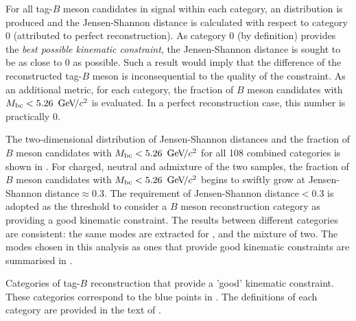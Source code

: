 For all tag-$B$ meson candidates in signal \MC within each category, an \Mbc distribution is produced 
and the Jensen-Shannon distance is calculated with respect to category 0 (attributed to perfect reconstruction).
As category 0 (by definition) provides the \textit{best possible kinematic constraint}, the Jensen-Shannon distance is sought to be as close to 0 as possible.
Such a result would imply that the difference of the reconstructed tag-$B$ meson is inconsequential to the quality of the constraint.
As an additional metric, for each category, the fraction of $B$ meson candidates with ${M_{\mathrm{bc}}}<5.26~{\mathrm{\,Ge\kern -0.1em V\!/}c^2}$ is evaluated.
In a perfect reconstruction case, this number is practically 0.

The two-dimensional distribution of Jensen-Shannon distances and the fraction of $B$ meson candidates with ${M_{\mathrm{bc}}}<5.26~{\mathrm{\,Ge\kern -0.1em V\!/}c^2}$
for all 108 combined categories is shown in .
For charged, neutral and admixture of the two samples, the fraction of $B$ meson candidates with ${M_{\mathrm{bc}}}<5.26~{\mathrm{\,Ge\kern -0.1em V\!/}c^2}$ begins to swiftly grow at Jensen-Shannon distance$\approx0.3$.
The requirement of Jensen-Shannon distance$<0.3$ is adopted as the threshold to consider a $B$ meson reconstruction category as providing a good kinematic constraint.
The results between different categories are consistent: the same modes are extracted for \Bp, \Bz and the mixture of two.
The modes chosen in this analysis as ones that provide good kinematic constraints are summarised in .

\begin{table}[htbp!]
    \centering
    \caption{\label{tab:error_codes}Categories of tag-$B$ reconstruction that provide a 'good' kinematic constraint.
    These categories correspond to the blue points in .
    The definitions of each category are provided in the text of .
    }
    
\end{table}

